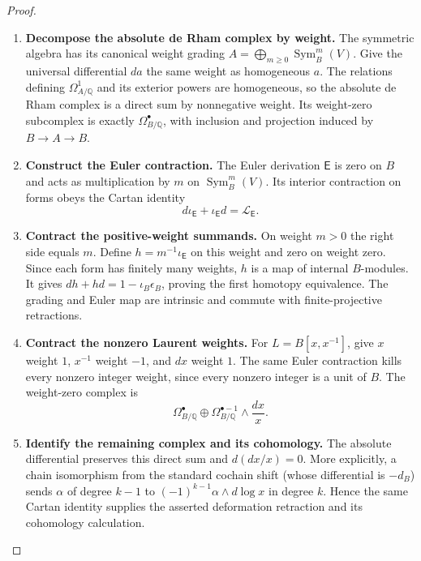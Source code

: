 \documentclass[11pt,a4paper]{article}
\numberwithin{algorithm}{section}
\numberwithin{equation}{section}
\theoremstyle{definition}
\theoremstyle{remark}
\theoremstyle{plain}
\newcommand{\QQ}{\mathbb Q}
\newcommand{\Sym}{\operatorname{Sym}}
\theoremstyle{definition}
\theoremstyle{plain}
\begin{document}
\begin{proof}\leavevmode
\begin{enumerate}[leftmargin=*,align=left]
\item \textbf{Decompose the absolute de Rham complex by weight.}
The symmetric algebra has its canonical weight grading
$A=\bigoplus_{m\ge0}\Sym_B^m(V)$.  Give the universal
differential $da$ the same weight as homogeneous $a$.
The relations defining $\Omega^1_{A/\QQ}$ and its exterior
powers are homogeneous, so the absolute de Rham complex is a
direct sum by nonnegative weight.  Its weight-zero subcomplex
is exactly $\Omega^\bullet_{B/\QQ}$, with inclusion and
projection induced by $B\to A\to B$.

\item \textbf{Construct the Euler contraction.}
The Euler derivation $\mathsf E$ is zero on $B$ and acts as
multiplication by $m$ on $\Sym_B^m(V)$.  Its interior contraction
on forms obeys the Cartan identity
\[
 d\iota_{\mathsf E}+\iota_{\mathsf E}d
   =\mathcal L_{\mathsf E}.
\]

\item \textbf{Contract the positive-weight summands.}
On weight $m>0$ the right side equals $m$.  Define
$h=m^{-1}\iota_{\mathsf E}$ on this weight and zero on
weight zero.  Since each form has finitely many
weights, $h$ is a map of internal $B$-modules.  It
gives $dh+hd=1-\iota_B\epsilon_B$, proving the first
homotopy equivalence.  The grading and Euler map are
intrinsic and commute with finite-projective retractions.

\item \textbf{Contract the nonzero Laurent weights.}
For $L=B[x,x^{-1}]$, give $x$ weight $1$, $x^{-1}$ weight
$-1$, and $dx$ weight $1$.  The same Euler contraction
kills every nonzero integer weight, since every nonzero
integer is a unit of $B$.  The weight-zero complex is
\[
 \Omega^\bullet_{B/\QQ}\oplus
 \Omega^{\bullet-1}_{B/\QQ}\wedge\frac{dx}{x}.
\]

\item \textbf{Identify the remaining complex and its cohomology.}
The absolute differential preserves this direct sum and
$d(dx/x)=0$.  More explicitly, a chain isomorphism from the
standard cochain shift (whose differential is $-d_B$) sends
$\alpha$ of degree $k-1$ to
$(-1)^{k-1}\alpha\wedge d\log x$ in degree $k$.
Hence the same Cartan identity supplies the asserted deformation
retraction and its cohomology calculation.
\end{enumerate}
\end{proof}
\end{document}
